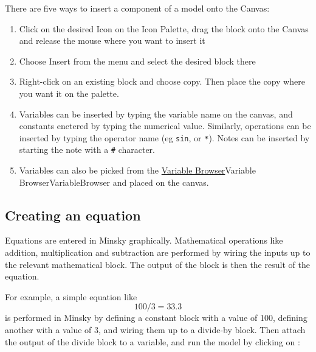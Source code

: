 There are five ways to insert a component of a model onto the Canvas:
\begin{enumerate}
\item Click on the desired Icon on the Icon Palette, drag the block
onto the Canvas and release the mouse where you want to insert it 

\begin{center}
\end{center}

\item Choose Insert from the menu and select the desired block there

  \begin{center}
  \end{center}
  \newpage
  
\item Right-click on an existing block and choose copy. Then place the
copy where you want it on the palette. 

\begin{center}
\end{center}

\item Variables can be inserted by typing the variable name on the
  canvas, and constants enetered by typing the numerical
  value. Similarly, operations can be inserted by typing the operator
  name (eg \verb+sin+, or \verb+*+). Notes can be inserted by starting
  the note with a \verb+#+ character.

\item Variables can also be picked from the \hyperref[ref]{Variable
    Browser}{Variable Browser}{}{VariableBrowser} and placed on the canvas.
\end{enumerate}


\subsection{Creating an equation}

Equations are entered in Minsky graphically. Mathematical operations
like addition, multiplication and subtraction are performed by wiring
the inputs up to the relevant mathematical block. The output of the
block is then the result of the equation. 

For example, a simple equation like
\begin{displaymath}
100/3 = 33.3
\end{displaymath}
is performed in Minsky by defining a constant block with a value of 100, defining another with a value of 3, and wiring them up to a divide-by block. Then attach the output of the divide block to a variable, and run the model by clicking on :

